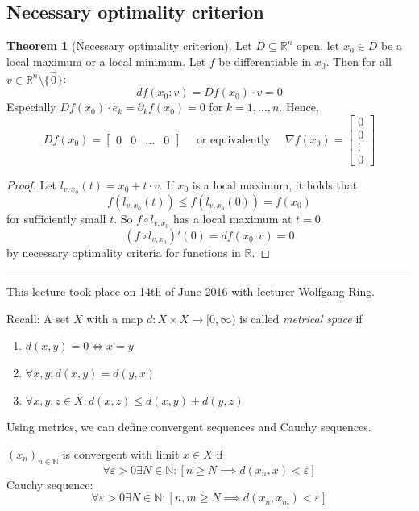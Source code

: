 \documentclass[a4paper,landscape,twocolumn]{article}
\theoremstyle{definition}
\newtheorem{theorem}{Theorem}
\newcommand\meta[3]{\hrule{} This #1 took place on #2 with lecturer #3.\par}
\begin{document}
\subsection{Necessary optimality criterion}
%
\begin{theorem}[Necessary optimality criterion]
Let $D \subseteq \mathbb R^n$ open, let $x_0 \in D$ be a local maximum or a local minimum. Let $f$ be differentiable in $x_0$. Then for all $v \in \mathbb R^n \setminus \{\vec{0}\}$:
\[ df(x_0; v) = Df(x_0) \cdot v = 0 \]
Especially $Df(x_0) \cdot e_k = \partial_k f(x_0) = 0$ for $k = 1, \ldots, n$. Hence,
\[ Df(x_0) = \begin{bmatrix} 0 & 0 & \ldots & 0 \end{bmatrix}
\quad \text{ or equivalently } \quad
\nabla f(x_0) = \begin{bmatrix} 0 \\ 0 \\ \vdots \\ 0 \end{bmatrix} \]
\end{theorem}
%
\begin{proof}
  Let $l_{v,x_0}(t) = x_0 + t \cdot v$. If $x_0$ is a local maximum,
  it holds that
  \[ f(l_{v,x_0}(t)) \leq f(l_{v,x_0}(0)) = f(x_0) \]
  for sufficiently small $t$.
  So $f \circ l_{v,x_0}$ has a local maximum at $t = 0$.
  \[ (f \circ l_{v,x_0})'(0) = df(x_0; v) = 0 \]
  by necessary optimality criteria for functions in $\mathbb R$.
\end{proof}

\meta{lecture}{14th of June 2016}{Wolfgang Ring}

Recall: A set $X$ with a map $d: X \times X \to [0, \infty)$ is called \emph{metrical space} if
\begin{enumerate}
  \item $d(x, y) = 0 \Leftrightarrow x = y$
  \item $\forall x, y: d(x, y) = d(y, x)$
  \item $\forall x, y, z \in X: d(x, z) \leq d(x, y) + d(y, z)$
\end{enumerate}

Using metrics, we can define convergent sequences and Cauchy sequences.

$(x_n)_{n\in\mathbb N}$ is convergent with limit $x \in X$ if
\[
  \forall \varepsilon > 0 \exists N \in \mathbb N:
          [n \geq N \implies d(x_n, x) < \varepsilon]
\]
Cauchy sequence:
\[
\forall \varepsilon > 0 \exists N \in \mathbb N:
        [n,m \geq N \implies d(x_n, x_m) < \varepsilon]
\]
\end{document}
